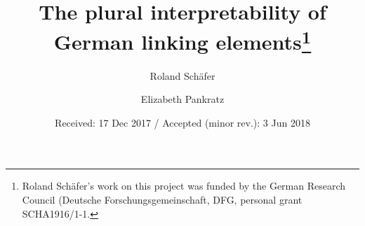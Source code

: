 

\smartqed

\title{The plural interpretability of German linking elements\thanks{Roland Schäfer's work on this project was funded by the German Research Council (Deutsche Forschungsgemeinschaft, DFG, personal grant SCHA1916/1-1.}}
\author{Roland Schäfer \and Elizabeth Pankratz}
\date{Received: 17 Dec 2017 / Accepted (minor rev.): 3 Jun 2018}
